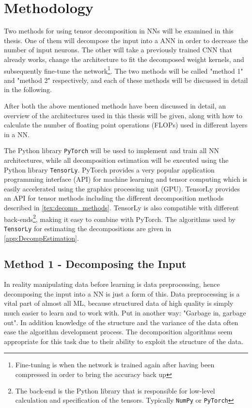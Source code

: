 \section{Methodology} \label{tex:methodology}
Two methods for using tensor decomposition in NNs will be examined in this thesis. One of them will decompose the input into a ANN in order to decrease the number of input neurons. The other will take a previously trained CNN that already works, change the architecture to fit the decomposed weight kernels, and subsequently fine-tune the network\footnote{Fine-tuning is when the network is trained again after having been compressed in order to bring the accuracy back up}. The two methods will be called "method 1" and "method 2" respectively, and each of these methods will be discussed in detail in the following. 

After both the above mentioned methods have been discussed in detail, an overview of the architectures used in this thesis will be given, along with how to calculate the number of floating point operations (FLOPs) used in different layers in a NN.

The Python library \texttt{PyTorch}\cite{pytorch} will be used to implement and train all NN architectures, while all decomposition estimation will be executed using the Python library \texttt{TensorLy}\cite{tensorly}. PyTorch provides a very popular application programming interface (API) for machine learning and tensor computing which is easily accelerated using the graphics processing unit (GPU). TensorLy provides an API for tensor methods including the different decomposition methods described in \autoref{tex:decomp_methods}. TensorLy is also compatible with different back-ends\footnote{The back-end is the Python library that is responsible for low-level calculation and specification of the tensors. Typically \texttt{NumPy}\cite{numpy} or \texttt{PyTorch}\cite{pytorch}}, making it easy to combine with PyTorch. The algorithms used by \texttt{TensorLy} for estimating the decompositions are given in \autoref{app:DecompEstimation}.

\subsection{Method 1 - Decomposing the Input}
In reality manipulating data before learning is data preprocessing, hence decomposing the input into a NN is just a form of this. Data preprocessing is a vital part of almost all ML, because structured data of high quality is simply much easier to learn and to work with. Put in another way: "Garbage in, garbage out". In addition knowledge of the structure and the variance of the data often ease the algorithm development process. The decomposition algorithms seem appropriate for this task due to their ability to exploit the structure of the data.

